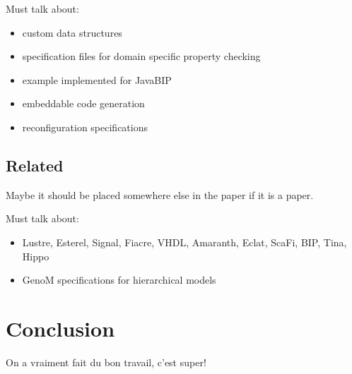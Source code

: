 \documentclass{article}
\begin{document}
Must talk about:
\begin{itemize}
    \item custom data structures
    \item specification files for domain specific property checking
    \item example implemented for JavaBIP
    \item embeddable code generation
    \item reconfiguration specifications
\end{itemize}

\subsection{Related}
Maybe it should be placed somewhere else in the paper if it is a paper.

Must talk about:
\begin{itemize}
    \item Lustre, Esterel, Signal, Fiacre, VHDL, Amaranth, Eclat, ScaFi, BIP, Tina, Hippo
    \item GenoM specifications for hierarchical models
\end{itemize}


\section{Conclusion}

On a vraiment fait du bon travail, c'est super!

\printbibliography


\newpage
\appendix
\end{document}
